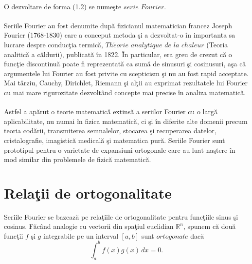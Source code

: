 \documentclass[a4paper,openany,12pt]{report}
\begin{document}
\paragraph*{}
O dezvoltare de forma (1.2) se nume\c ste $serie$ $Fourier$.
\paragraph*{}Seriile Fourier au fost denumite dup\u a fizicianul matematician francez Joseph Fourier (1768-1830) care a conceput metoda \c si a dezvoltat-o \^ in importanta sa lucrare despre conduc\c tia termic\u a, $Th\acute{e}orie$ $analytique$ $de$ $la$ $chaleur$ (Teoria analitic\u a a c\u aldurii), publicat\u a \^ in 1822. \^ In particular, era greu de crezut c\u a o func\c tie discontinu\u a poate fi reprezentat\u a ca sum\u a de sinusuri \c si cosinusuri, a\c sa c\u a argumentele lui Fourier au fost privite cu scepticism \c si nu au fost rapid acceptate. Mai t\^ arziu, Cauchy, Dirichlet, Riemann \c si al\c tii au exprimat rezultatele lui Fourier cu mai mare rigurozitate dezvolt\^ and concepte mai precise \^ in analiza matematic\u a.
\paragraph*{}Astfel a ap\u arut o teorie matematic\u a extins\u a a seriilor Fourier cu o larg\u a aplicabilitate, nu numai \^ in fizica matematic\u a, ci \c si \^ in diferite alte domenii precum teoria cod\u arii, transmiterea semnalelor, stocarea \c si recuperarea datelor, cristalografie, imagistic\u a medical\u a \c si matematica pur\u a. Seriile Fourier sunt prototipul pentru o varietate de expansiuni ortogonale care au luat na\c stere \^ in mod similar din problemele de fizic\u a matematic\u a. 


\section{Rela\c tii de ortogonalitate}
\paragraph*{}Seriile Fourier se bazeaz\u a pe rela\c tiile de ortogonalitate pentru func\c tiile sinus \c si cosinus. F\u ac\^ and analogie cu vectorii din spa\c tiul euclidian $\mathbb{R}^n$, spunem c\u a dou\u a func\c tii $f$ \c si $g$ integrabile pe un interval $[a, b]$ sunt $ortogonale$ dac\u a
\begin{equation*}
\int_a^b f(x)g(x)\,dx = 0.
\end{equation*}
\end{document}
